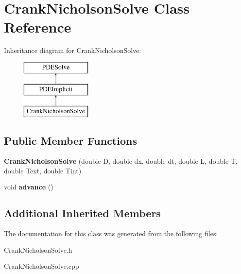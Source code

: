 \hypertarget{class_crank_nicholson_solve}{}\section{Crank\+Nicholson\+Solve Class Reference}
\label{class_crank_nicholson_solve}
Inheritance diagram for Crank\+Nicholson\+Solve\+:\begin{figure}[H]
\begin{center}
\leavevmode
\includegraphics[height=3.000000cm]{class_crank_nicholson_solve}
\end{center}
\end{figure}
\subsection*{Public Member Functions}
\begin{DoxyCompactItemize}
\item 
\mbox{\label{class_crank_nicholson_solve_a0608d2d606626bf02c580f87b5a467ed}} 
{\bfseries Crank\+Nicholson\+Solve} (double D, double dx, double dt, double L, double T, double Text, double Tint)
\item 
\mbox{\label{class_crank_nicholson_solve_a82fe6f2538bc90d62842d26736ba8707}} 
void {\bfseries advance} ()
\end{DoxyCompactItemize}
\subsection*{Additional Inherited Members}


The documentation for this class was generated from the following files\+:\begin{DoxyCompactItemize}
\item 
Crank\+Nicholson\+Solve.\+h\item 
Crank\+Nicholson\+Solve.\+cpp\end{DoxyCompactItemize}
